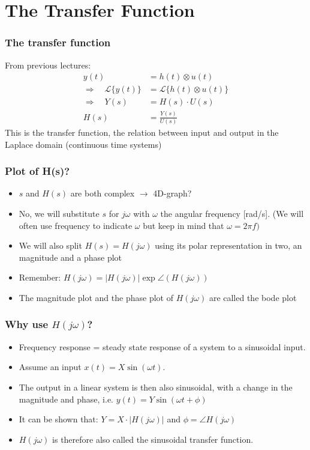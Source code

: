 
\section{The Transfer Function}


\begin{frame}
\frametitle{The transfer function}

From previous lectures:
\begin{align*}
    y(t) &= h(t) \otimes u(t)  \\
    \Rightarrow \quad 
    \mathscr{L}\{y(t)\} &= \mathscr{L}\{h(t) \otimes u(t)\}  \\
    \Rightarrow \quad
    Y(s) &= H(s) \cdot U(s)\\
    H(s) &= \frac{Y(s)}{U(s)}
\end{align*}
This is the transfer function, the relation between input and output in the Laplace domain (continuous time systems)


\end{frame}

\begin{frame}
\frametitle{Plot of H(s)?}

\begin{itemize}
\item $s$ and $H(s)$ are both complex $\rightarrow$ 4D-graph?
\item No, we will substitute $s$ for $j\omega$ with $\omega$ the angular frequency [rad/s].
(We will often use frequency to indicate $\omega$ but keep in mind that $\omega = 2\pi f)$
\item We will also split $H(s) = H(j\omega)$ using its polar representation in two, an magnitude and a phase plot
\item Remember: $H(j\omega) = |H(j\omega)| \exp\angle(H(j\omega))$ 
\item The magnitude plot and the phase plot of $H(j\omega)$ are called the bode plot

\end{itemize}
\end{frame}


\begin{frame}
\frametitle{Why use $H(j\omega)$?}
\begin{itemize}
\item Frequency response = steady state response of a system to a sinusoidal input.\\
\item Assume an input $x(t) = X\sin(\omega t)$.\\
\item The output in a linear system is then also sinusoidal, with a change in the magnitude and phase, i.e. $y(t) = Y\sin(\omega t + \phi)$\\
\item It can be shown that: $Y = X\cdot |H(j\omega)|$ and $\phi = \angle H(j\omega)$\\
\item $H(j\omega)$ is therefore also called the sinusoidal transfer function. 
\end{itemize}



\end{frame}

